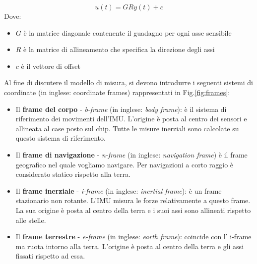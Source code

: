 \begin{equation}
    u(t) = G R y(t) + c
\end{equation}
Dove:
\begin{itemize}
	\item $G$ è la matrice diagonale contenente il guadagno per ogni asse sensibile
	\item $R$ è la matrice di allineamento che specifica la direzione degli assi
	\item $c$ è il vettore di offset 
\end{itemize}
Al fine di discutere il modello di misura, si devono introdurre i seguenti sistemi di coordinate (in inglese: coordinate frames) rappresentati in Fig.\ref{fig:frames}:

\begin{itemize}
	\item Il \textbf{frame del corpo} - \textit{b-frame} (in inglese: \textit{body frame}): è il sistema							 di riferimento dei movimenti dell'IMU. L'origine è posta al centro dei sensori e allineata al case posto sul chip. Tutte le misure inerziali sono calcolate su questo sistema di riferimento.
	\item Il \textbf{frame di navigazione} - \textit{n-frame} (in inglese: \textit{navigation frame}) è il frame geografico nel quale vogliamo navigare. Per navigazioni a corto raggio è considerato statico rispetto alla terra.
	\item Il \textbf{frame inerziale} - \textit{i-frame} (in inglese: \textit{inertial frame}): è un frame stazionario non rotante. L'IMU misura le forze relativamente a questo frame. La sua origine è posta al centro della terra e i suoi assi sono allineati rispetto alle stelle.
	\item Il \textbf{frame terrestre} - \textit{e-frame} (in inglese: \textit{earth frame}): coincide con l' i-frame ma ruota intorno alla terra. L'origine è posta al centro della terra e gli assi fissati rispetto ad essa.
\end{itemize}



